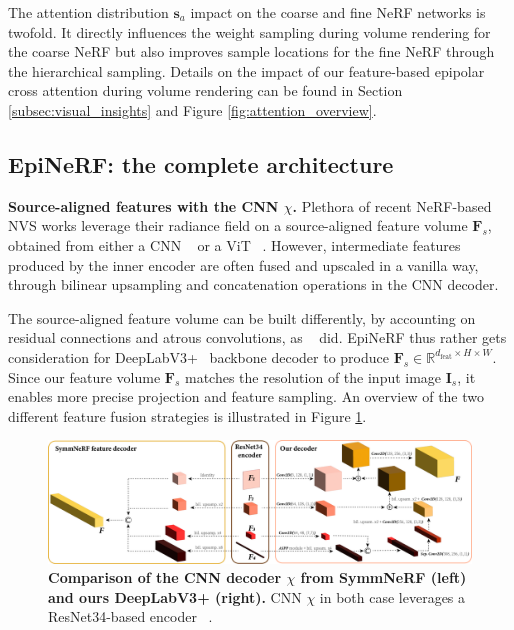 The attention distribution $\textbf{s}_{a}$ impact on the coarse and fine \ac{NeRF} networks is twofold. It directly influences the weight sampling during volume rendering for the coarse \ac{NeRF} but also improves sample locations for the fine \ac{NeRF} through the hierarchical sampling. Details on the impact of our feature-based epipolar cross attention during volume rendering can be found in Section \ref{subsec:visual_insights} and Figure \ref{fig:attention_overview}.  

\subsection{EpiNeRF: the complete architecture}
\label{subsec:epinerf}

\noindent\textbf{Source-aligned features with the CNN $\chi$.} Plethora of recent \ac{NeRF}-based \ac{NVS} works leverage their radiance field on a source-aligned feature volume $\mathbf{F}_{s}$, obtained from either a CNN ~\citep{jang2021codenerf,yu2021pixelnerf,li2022symmnerf} or a \ac{ViT} ~\citep{lin2023vision}. However, intermediate features produced by the inner encoder are often fused and upscaled in a vanilla way, through bilinear upsampling and concatenation operations in the \ac{CNN} decoder. 

The source-aligned feature volume can be built differently, by accounting on residual connections and atrous convolutions, as ~\citep{chan2023genvs} did. 
EpiNeRF thus rather gets consideration for DeepLabV3+~\citep{chen2018encoder} backbone decoder to produce $\textbf{F}_{s}\in \mathbb{R}^{d_{\text{feat}} \times H \times W}$. Since our feature volume $\textbf{F}_{s}$ matches the resolution of the input image $\mathbf{I}_s$, it enables more precise projection and feature sampling. An overview of the two different feature fusion strategies is illustrated in Figure \ref{fig:feature_encoder}. 

\begin{figure}[h!]
  \begin{center}
  \includegraphics[width=\linewidth]{images/epinerf/feature_fusion_encoder.png}
  \end{center}
     \caption{\textbf{Comparison of the CNN decoder $\chi$ from SymmNeRF (left) and ours DeepLabV3+ (right).} CNN $\chi$ in both case leverages a ResNet34-based encoder ~\citep{he2016deep}. }
  \label{fig:feature_encoder}
  \end{figure}



